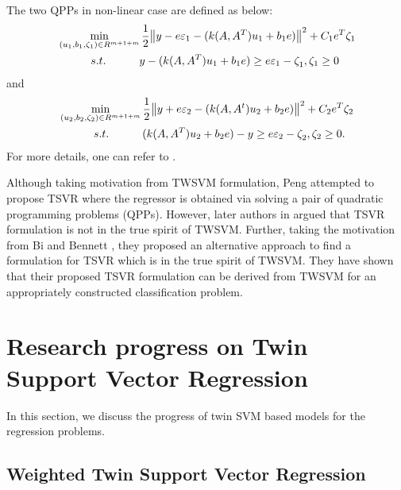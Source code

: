 \documentclass[pdflatex,sn-mathphys]{sn-jnl}%
\theoremstyle{thmstyleone}%
\theoremstyle{thmstyletwo}%
\theoremstyle{thmstylethree}%
\begin{document}
The two QPPs in non-linear case are defined as below:
\begin{align}
& \mathop{\min }\limits_{(u_{1} ,b_{1} ,\zeta_1 )\in R^{m+1+m} } \frac{1}{2} \norm{y-e \varepsilon _{1} -(k(A,A^{T} )u_{1} +b_{1} e)}^{2} +C_{1} e_{}^{T} \zeta_1  \notag\\
&\quad \quad \quad s.t. \quad\quad\quad y-(k(A,A^{T} )u_{1} +b_{1} e)\ge e\varepsilon _{1} - \zeta_1  ^{} , \zeta_1  \ge 0
\end{align}
and
\begin{align}
&\mathop{\min }\limits_{(u_{2} ,b_{2} ,\zeta_2 )\in R^{m+1+m} } \frac{1}{2} \norm{y+e \varepsilon _{2} -(k(A,A^{t} )u_{2} +b_{2} e)}^{2} +C_{2} e_{}^T \zeta_2 \notag\\ 
& \,\quad\quad \quad s.t. \quad\quad\quad  (k(A,A^{T} )u_{2} +b_{2} e)-y\ge e \varepsilon _{2} -\zeta_2 ^{} , \zeta_2 \ge 0.
\end{align}
For more details, one can refer to \cite{peng2010tsvr}. 

Although taking motivation from TWSVM formulation, Peng  \cite{peng2010tsvr} attempted to propose TSVR where the regressor is obtained via solving a pair of quadratic programming problems (QPPs). However, later authors in \cite{khemchandani2016twsvr}  argued that TSVR formulation is not in the true spirit of TWSVM. Further, taking the motivation from Bi and Bennett \cite{Biandbennett}, they proposed an alternative approach to find a formulation for 
TSVR which is in the true spirit of TWSVM. They have shown that their proposed TSVR  formulation can be derived from TWSVM for an appropriately constructed classification problem.


\section{Research progress on Twin Support Vector Regression}
\label{sec:Research progress on Twin Support Vector Regression}
In this section, we discuss the progress of twin SVM based models for the regression problems.

\subsection{Weighted Twin Support Vector Regression}
\end{document}

